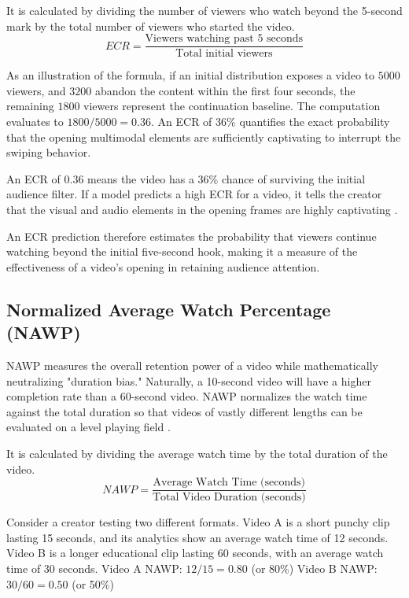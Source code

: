 It is calculated by dividing the number of viewers who watch beyond the 5-second mark by the total number of viewers who started the video.$$ECR=\frac{\text{Viewers watching past 5 seconds}}{\text{Total initial viewers}}$$

As an illustration of the formula, if an initial distribution exposes a video to $5000$ viewers, and $3200$ abandon the content within the first four seconds, the remaining $1800$ viewers represent the continuation baseline. The computation evaluates to $1800/5000 = 0.36$. An ECR of 36\% quantifies the exact probability that the opening multimodal elements are sufficiently captivating to interrupt the swiping behavior.


An ECR of 0.36 means the video has a 36\% chance of surviving the initial audience filter. If a model predicts a high ECR for a video, it tells the creator that the visual and audio elements in the opening frames are highly captivating  \cite{li2024delving}.

An ECR prediction therefore estimates the probability that viewers continue watching beyond the initial five-second hook, making it a measure of the effectiveness of a video's opening in retaining audience attention.

\subsection{Normalized Average Watch Percentage (NAWP)}

NAWP measures the overall retention power of a video while mathematically neutralizing "duration bias." Naturally, a 10-second video will have a higher completion rate than a 60-second video. NAWP normalizes the watch time against the total duration so that videos of vastly different lengths can be evaluated on a level playing field \cite{li2024delving}.

It is calculated by dividing the average watch time by the total duration of the video.$$NAWP=\frac{\text{Average Watch Time (seconds)}}{\text{Total Video Duration (seconds)}}$$

Consider a creator testing two different formats. Video A is a short punchy clip lasting 15 seconds, and its analytics show an average watch time of 12 seconds. Video B is a longer educational clip lasting 60 seconds, with an average watch time of 30 seconds. Video A NAWP: $12/15=0.80$ (or 80\%) Video B NAWP: $30/60=0.50$ (or 50\%)

